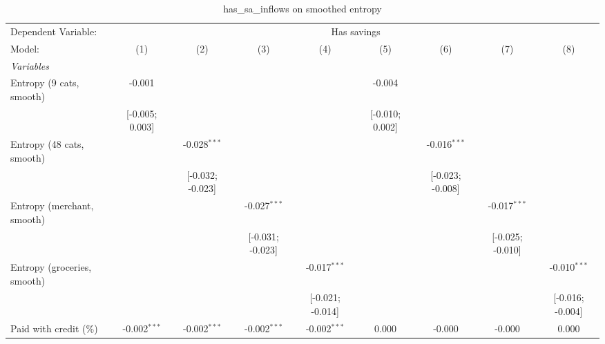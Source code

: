 
\begin{table}[htbp]
   \centering
   \tiny
   \begin{threeparttable}[b]
      \caption{\label{tab:reg_has_sa_inflows_s} has\_sa\_inflows on smoothed entropy}
      \begin{tabular}{lcccccccc}
         \tabularnewline \midrule \midrule
         Dependent Variable: & \multicolumn{8}{c}{Has savings}\\
         Model:                      & (1)              & (2)              & (3)              & (4)              & (5)             & (6)              & (7)              & (8)\\  
         \midrule
         \emph{Variables}\\
         Entropy (9 cats, smooth)    & -0.001           &                  &                  &                  & -0.004          &                  &                  &   \\   
                                     & [-0.005; 0.003]  &                  &                  &                  & [-0.010; 0.002] &                  &                  &   \\   
         Entropy (48 cats, smooth)   &                  & -0.028$^{***}$   &                  &                  &                 & -0.016$^{***}$   &                  &   \\   
                                     &                  & [-0.032; -0.023] &                  &                  &                 & [-0.023; -0.008] &                  &   \\   
         Entropy (merchant, smooth)  &                  &                  & -0.027$^{***}$   &                  &                 &                  & -0.017$^{***}$   &   \\   
                                     &                  &                  & [-0.031; -0.023] &                  &                 &                  & [-0.025; -0.010] &   \\   
         Entropy (groceries, smooth) &                  &                  &                  & -0.017$^{***}$   &                 &                  &                  & -0.010$^{***}$\\   
                                     &                  &                  &                  & [-0.021; -0.014] &                 &                  &                  & [-0.016; -0.004]\\   
         Paid with credit (\%)       & -0.002$^{***}$   & -0.002$^{***}$   & -0.002$^{***}$   & -0.002$^{***}$   & 0.000           & -0.000           & -0.000           & 0.000\\   

\end{tabular}
\end{threeparttable}
\end{table}
